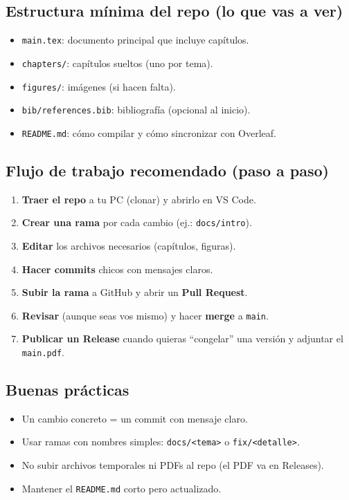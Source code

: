 \subsection*{Estructura mínima del repo (lo que vas a ver)}
\begin{itemize}[leftmargin=1.2em]
  \item \texttt{main.tex}: documento principal que incluye capítulos.
  \item \texttt{chapters/}: capítulos sueltos (uno por tema).
  \item \texttt{figures/}: imágenes (si hacen falta).
  \item \texttt{bib/references.bib}: bibliografía (opcional al inicio).
  \item \texttt{README.md}: cómo compilar y cómo sincronizar con Overleaf.
\end{itemize}

\subsection*{Flujo de trabajo recomendado (paso a paso)}
\begin{enumerate}[leftmargin=1.2em]
  \item \textbf{Traer el repo} a tu PC (clonar) y abrirlo en VS Code.
  \item \textbf{Crear una rama} por cada cambio (ej.: \texttt{docs/intro}).
  \item \textbf{Editar} los archivos necesarios (capítulos, figuras).
  \item \textbf{Hacer commits} chicos con mensajes claros.
  \item \textbf{Subir la rama} a GitHub y abrir un \textbf{Pull Request}.
  \item \textbf{Revisar} (aunque seas vos mismo) y hacer \textbf{merge} a \texttt{main}.
  \item \textbf{Publicar un Release} cuando quieras “congelar” una versión y adjuntar el \texttt{main.pdf}.
\end{enumerate}

\subsection*{Buenas prácticas}
\begin{itemize}[leftmargin=1.2em]
  \item Un cambio concreto = un commit con mensaje claro.
  \item Usar ramas con nombres simples: \texttt{docs/<tema>} o \texttt{fix/<detalle>}.
  \item No subir archivos temporales ni PDFs al repo (el PDF va en Releases).
  \item Mantener el \texttt{README.md} corto pero actualizado.
\end{itemize}

